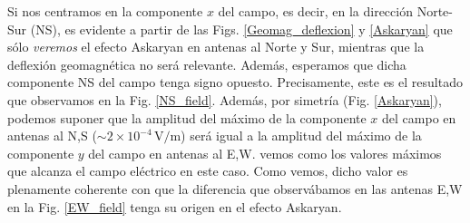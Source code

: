 \documentclass[12 pt, a4paper]{article} %
\numberwithin{equation}{section}
\numberwithin{figure}{section}
\numberwithin{table}{section}
\begin{document}
Si nos centramos en la componente $x$ del campo, es decir, en la dirección Norte-Sur (NS), es evidente a partir de las Figs. \ref{Geomag_deflexion} y \eqref{Askaryan} que sólo \textit{veremos} el efecto Askaryan en antenas al Norte y Sur, mientras que la deflexión geomagnética no será relevante. Además, esperamos que dicha componente NS del campo tenga signo opuesto. Precisamente, este es el resultado que observamos en la Fig. \ref{NS_field}. Además, por simetría (Fig. \ref{Askaryan}), podemos suponer que la amplitud del máximo de la componente $x$ del campo en antenas al N,S ($\sim 2\times10^{-4}\,\mathrm{V/m}$) será igual a la amplitud del máximo de la componente $y$ del campo en antenas al E,W.  vemos como los valores máximos que alcanza el campo eléctrico en este caso. Como vemos, dicho valor es plenamente coherente con que la diferencia que observábamos en las antenas E,W en la Fig. \ref{EW_field} tenga su origen en el efecto Askaryan.
\end{document}
